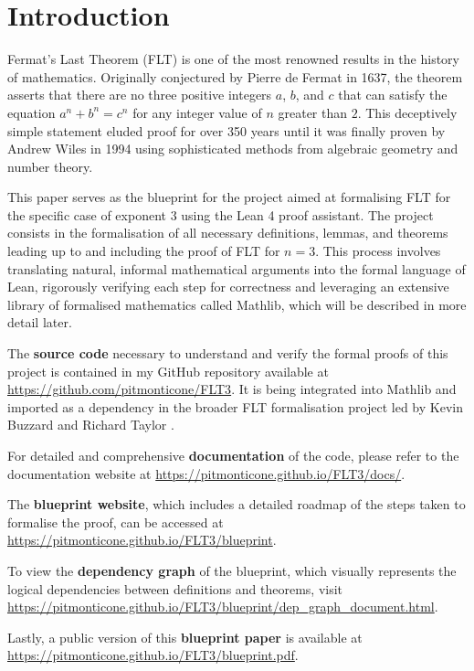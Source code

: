 \chapter*{Introduction}

Fermat's Last Theorem (FLT) is one of the most renowned results in the history of mathematics.
Originally conjectured by Pierre de Fermat in 1637, the theorem asserts that there are no three
positive integers $a$, $b$, and $c$ that can satisfy the equation $a^n + b^n = c^n$ for any
integer value of $n$ greater than $2$. This deceptively simple statement eluded proof for over
350 years until it was finally proven by Andrew Wiles in 1994 using sophisticated methods from
algebraic geometry and number theory.

This paper serves as the blueprint for the project aimed at formalising FLT for the specific case of
exponent $3$ using the Lean 4 proof assistant.
The project consists in the formalisation of all necessary definitions, lemmas, and theorems leading up to
and including the proof of FLT for $n = 3$. This process involves translating natural, informal mathematical arguments
into the formal language of Lean, rigorously verifying each step for correctness and leveraging
an extensive library of formalised mathematics called Mathlib,
which will be described in more detail later.

The \textbf{source code} necessary to understand and verify the formal proofs of this project is contained
in my GitHub repository available at \url{https://github.com/pitmonticone/FLT3}. It is being integrated into
Mathlib and imported as a dependency in the broader FLT formalisation project led by Kevin Buzzard and Richard Taylor \cite{FLT}.

For detailed and comprehensive \textbf{documentation} of the code, please refer to the documentation website at \url{https://pitmonticone.github.io/FLT3/docs/}.

The \textbf{blueprint website}, which includes a detailed roadmap of the steps taken to formalise the proof,
can be accessed at \url{https://pitmonticone.github.io/FLT3/blueprint}.

To view the \textbf{dependency graph} of the blueprint, which visually represents the logical dependencies
between definitions and theorems, visit \url{https://pitmonticone.github.io/FLT3/blueprint/dep_graph_document.html}.

Lastly, a public version of this \textbf{blueprint paper} is available at \url{https://pitmonticone.github.io/FLT3/blueprint.pdf}.

